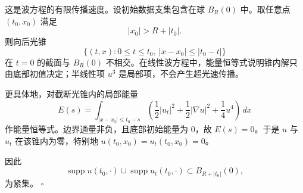 \documentclass[UTF8,12pt]{ctexart}
\newcommand{\supp}{\operatorname{supp}}
\newenvironment{solution}{%
  \par\medskip
  \noindent{\bfseries 解答}\quad\ignorespaces
}{\hfill$\square$\par\medskip}
\begin{document}
\begin{solution}
这是波方程的有限传播速度。设初始数据支集包含在球 \(B_R(0)\) 中。取任意点 \((t_0,x_0)\) 满足
\[
|x_0|>R+|t_0|.
\]
则向后光锥
\[
\{(t,x):0\le t\le t_0,\ |x-x_0|\le |t_0-t|\}
\]
在 \(t=0\) 的截面与 \(B_R(0)\) 不相交。在线性波方程中，能量恒等式说明锥内解只由底部初值决定；半线性项 \(u^3\) 是局部项，不会产生超光速传播。

更具体地，对截断光锥内的局部能量
\[
E(s)=\int_{|x-x_0|\le t_0-s}
\left(\frac12|u_t|^2+\frac12|\nabla u|^2+\frac14u^4\right)\,dx
\]
作能量恒等式。边界通量非负，且底部初始能量为 \(0\)，故 \(E(s)=0\)。于是 \(u\) 与 \(u_t\) 在该锥内为零，特别地 \(u(t_0,x_0)=u_t(t_0,x_0)=0\)。

因此
\[
\supp u(t_0,\cdot)\cup\supp u_t(t_0,\cdot)\subset B_{R+|t_0|}(0),
\]
为紧集。
\end{solution}
\end{document}
